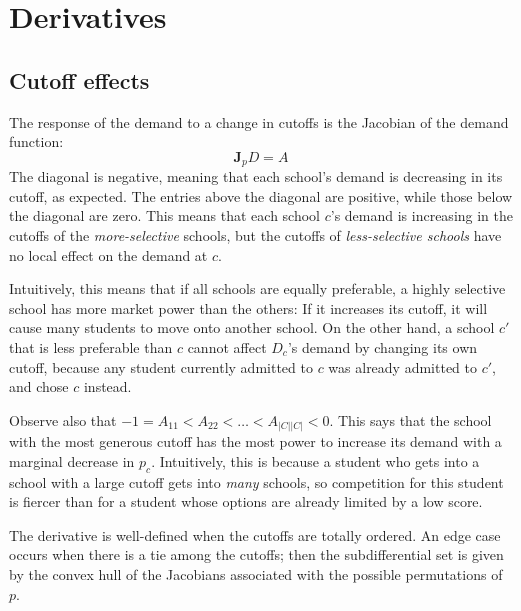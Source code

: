 \documentclass[12pt]{article}
\numberwithin{equation}{subsection}
\theoremstyle{definition}
\begin{document}
\section{Derivatives}
\subsection{Cutoff effects} \label{unconstrainedcutoffeffects}
The response of the demand to a change in cutoffs is the Jacobian of the demand function:
\[\mathbf{J}_p D = A \]
The diagonal is negative, meaning that each school's demand is decreasing in its cutoff, as expected. The entries above the diagonal are positive, while those below the diagonal are zero. This means that each school $c$'s demand is increasing in the cutoffs of the \emph{more-selective} schools, but the cutoffs of \emph{less-selective schools} have no local effect on the demand at $c$.

Intuitively, this means that if all schools are equally preferable, a highly selective school has more market power than the others: If it increases its cutoff, it will cause many students to move onto another school. On the other hand, a school $c'$ that is less preferable than $c$ cannot affect $D_c$'s demand by changing its own cutoff, because any student currently admitted to $c$ was already admitted to $c'$, and chose $c$ instead. 

Observe also that $-1 = A_{11} < A_{22} < \dots < A_{|C||C|} < 0$. This says that the school with the most generous cutoff has the most power to increase its demand with a marginal decrease in $p_c$. Intuitively, this is because a student who gets into a school with a large cutoff gets into \emph{many} schools, so competition for this student is fiercer than for a student whose options are already limited by a low score. 

The derivative is well-defined when the cutoffs are totally ordered. An edge case occurs when there is a tie among the cutoffs; then the subdifferential set is given by the convex hull of the Jacobians associated with the possible permutations of $p$. 
\end{document}
